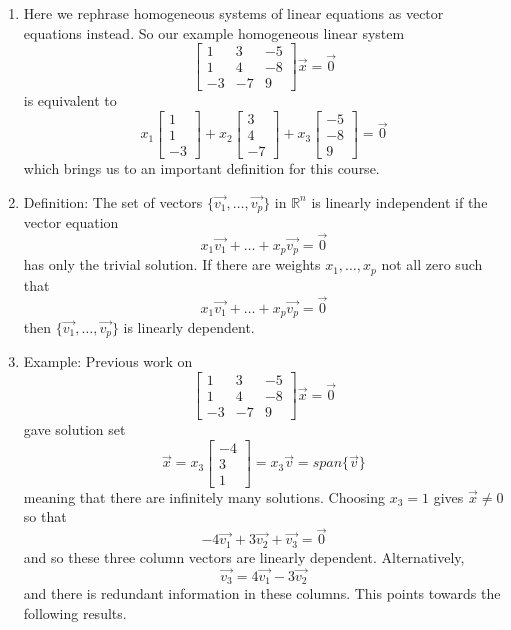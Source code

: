 \documentclass{article}
\begin{document}
\begin{enumerate}

\item Here we rephrase homogeneous systems of linear equations as vector equations instead. So our example homogeneous linear system 
\[
\left[
\begin{array}{ccc}
1 & 3 & -5 \\
1 & 4 & -8 \\
-3 & -7 & 9 
\end{array}
\right]
\vec{x} = 
\vec{0}
\] 
is equivalent to
\[
x_1 \left[
\begin{array}{c}
1 \\
1 \\
-3 
\end{array}
\right]
+ x_2 \left[
\begin{array}{c}
 3  \\
 4  \\
 -7 
\end{array}
\right]
+ x_3 \left[
\begin{array}{c}
 -5 \\
 -8 \\
 9 
\end{array}
\right]
 = 
\vec{0}
\] 
which brings us to an important definition for this course.

\item Definition: The set of vectors $\{ \vec{v_1}, \dots, \vec{v_p} \}$ in $\mathbb{R}^n$ is linearly independent if the vector equation
\[
x_1 \vec{v_1} + \dots + x_p \vec{v_p} = \vec{0}
\]
has only the trivial solution. If there are weights $x_1, \dots, x_p$ not all zero such that 
\[
x_1 \vec{v_1} + \dots + x_p \vec{v_p} = \vec{0}
\]
then $\{ \vec{v_1}, \dots, \vec{v_p} \}$ is linearly dependent.


\item Example: Previous work on 
\[
\left[
\begin{array}{ccc}
1 & 3 & -5 \\
1 & 4 & -8 \\
-3 & -7 & 9 
\end{array}
\right]
\vec{x} = 
\vec{0}
\] 
gave solution set
\[
\vec{x} = 
x_3\left[
\begin{array}{ccc}
-4 \\
3 \\
1 
\end{array}
\right]
= x_3 \vec{v} = span \{ \vec{v} \}
\]
meaning that there are infinitely many solutions. Choosing $x_3=1$ gives $\vec{x} \neq 0$ so that
\[
-4\vec{v_1} + 3\vec{v_2} + \vec{v_3} = \vec{0}
\]
and so these three column vectors are linearly dependent. Alternatively,
\[
\vec{v_3} = 4\vec{v_1} - 3\vec{v_2} 
\]
and there is redundant information in these columns. This points towards the following results.


\end{enumerate}
\end{document}

